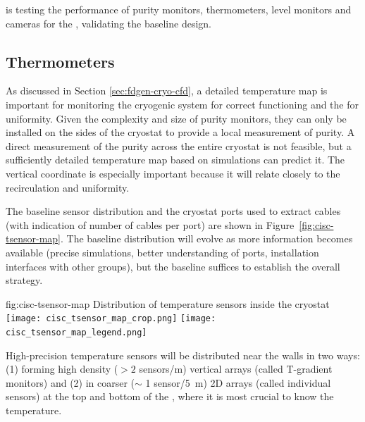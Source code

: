  is testing the performance of 
purity monitors, thermometers, level monitors and cameras
for the , validating the baseline  %
design.





\subsection{Thermometers}
\label{sec:fdsp-cryo-therm}
As discussed in Section \ref{sec:fdgen-cryo-cfd}, a detailed \threed temperature map is important %
for monitoring %
the cryogenic system for correct functioning and the  for uniformity.
Given the complexity and size of purity monitors, they can only be installed on the sides of the cryostat to provide a local measurement of
 purity.  
A direct measurement of the  purity across the entire cryostat is not feasible, but a sufficiently detailed \threed temperature map based on  simulations can predict it. The vertical coordinate is especially important because it will relate closely to the 
 recirculation and uniformity. 

The baseline sensor distribution and the cryostat ports used to extract cables (with indication of number of cables per port) are shown in Figure~\ref{fig:cisc-tsensor-map}. The baseline distribution will evolve as more information becomes available (precise  simulations, better understanding of  ports, installation interfaces with other groups), but the baseline suffices to establish the overall strategy.

\begin{dunefigure}{fig:cisc-tsensor-map}
  {Distribution of temperature sensors inside the cryostat}
  \texttt{[image: cisc\_tsensor\_map\_crop.png]}
  \texttt{[image: cisc\_tsensor\_map\_legend.png]}
\end{dunefigure}

High-precision temperature sensors will be distributed near the  walls in two ways:
(1) forming high density (\(>2\) sensors/\si{m}) vertical arrays %
(called T-gradient monitors) and (2) in coarser ($\sim$ 1 sensor/\SI{5}{m}) 2D arrays %
(called individual sensors) at the top and bottom of the , where it is most crucial to know the temperature.

